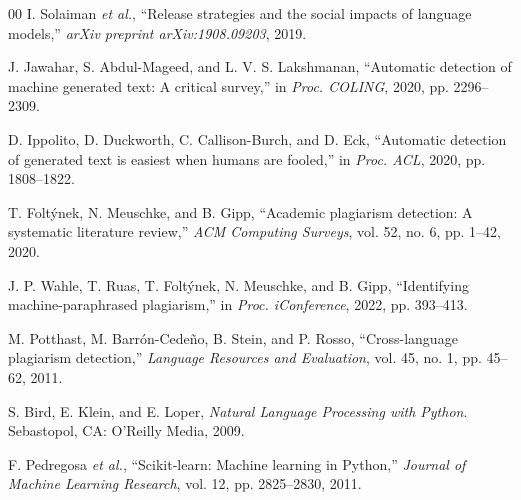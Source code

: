 \documentclass[conference]{IEEEtran}
\begin{document}
\begin{thebibliography}{00}
 I. Solaiman \textit{et al.}, ``Release strategies and the social impacts of language models,'' \textit{arXiv preprint arXiv:1908.09203}, 2019.

 J. Jawahar, S. Abdul-Mageed, and L. V. S. Lakshmanan, ``Automatic detection of machine generated text: A critical survey,'' in \textit{Proc. COLING}, 2020, pp. 2296--2309.

 D. Ippolito, D. Duckworth, C. Callison-Burch, and D. Eck, ``Automatic detection of generated text is easiest when humans are fooled,'' in \textit{Proc. ACL}, 2020, pp. 1808--1822.

 T. Folt\'{y}nek, N. Meuschke, and B. Gipp, ``Academic plagiarism detection: A systematic literature review,'' \textit{ACM Computing Surveys}, vol. 52, no. 6, pp. 1--42, 2020.

 J. P. Wahle, T. Ruas, T. Folt\'{y}nek, N. Meuschke, and B. Gipp, ``Identifying machine-paraphrased plagiarism,'' in \textit{Proc. iConference}, 2022, pp. 393--413.

 M. Potthast, M. Barr\'{o}n-Cede\~{n}o, B. Stein, and P. Rosso, ``Cross-language plagiarism detection,'' \textit{Language Resources and Evaluation}, vol. 45, no. 1, pp. 45--62, 2011.

 S. Bird, E. Klein, and E. Loper, \textit{Natural Language Processing with Python}. Sebastopol, CA: O'Reilly Media, 2009.

 F. Pedregosa \textit{et al.}, ``Scikit-learn: Machine learning in Python,'' \textit{Journal of Machine Learning Research}, vol. 12, pp. 2825--2830, 2011.
\end{thebibliography}
\end{document}
